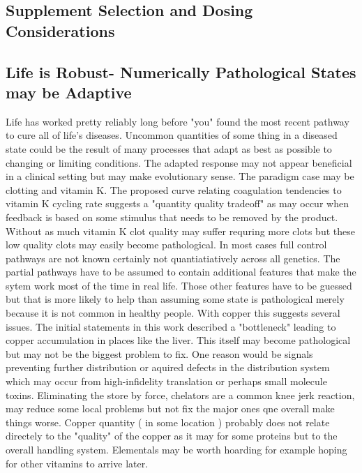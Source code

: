 \subsection{Supplement Selection and Dosing Considerations  }


\subsection{Life is Robust- Numerically Pathological States may be Adaptive }
Life has worked pretty reliably long before "you" found the
most recent pathway to cure all of life's diseases.
Uncommon quantities of some thing in a diseased state could be the
result of many processes that adapt as best as possible to changing
or limiting conditions. The adapted response may not appear beneficial
in a clinical setting but may make evolutionary sense. 
The paradigm case may be clotting and vitamin K. The proposed
curve relating coagulation tendencies to vitamin K cycling rate
\cite{marchywka-MJM-2022-015-0.20c}
suggests a "quantity quality tradeoff" as may occur when feedback
is based on some stimulus that needs to be removed by the product.
Without as much vitamin K clot quality may suffer requring 
more clots but these low quality clots may easily become pathological.
In most cases full control pathways are not known certainly
not quantiatiatively across all genetics. The partial pathways
have to be assumed to contain additional features
that make the sytem work most of the time in real life.
Those other features have to be guessed but that is more likely
to help than assuming some state is pathological merely
because it is not common in healthy people.
With copper this suggests several issues. The initial statements
in this work described a "bottleneck" leading
to copper accumulation in places like the liver. This itself
may become pathological but may not be the biggest problem
to fix. One reason would be signals preventing further distribution
or aquired defects in the distribution system which may occur 
from high-infidelity translation or perhaps small molecule toxins.  
Eliminating the store by force, chelators are a common knee
jerk reaction,  may reduce some local problems but not fix the
major ones qne overall make things worse. 
Copper quantity ( in some location ) probably does not relate
directely to the "quality" of the copper as it may for some
proteins but to the overall handling system. Elementals may be
worth hoarding for example hoping for other vitamins to arrive
later. 

